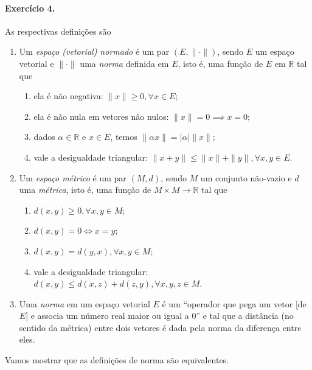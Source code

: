 \documentclass[12pt,a4paper]{article}
\begin{document}
\paragraph{Exercício 4.} As respectivas definições são
\begin{enumerate}
    \item Um \textit{espaço (vetorial) normado} é um par $(E, \|\cdot \|)$, sendo $E$ um espaço vetorial e $\|\cdot \|$ 
    uma \textit{norma} definida em $E$, isto é, uma função de $E$ em $\mathbb{R}$ tal que
    \begin{enumerate}
        \item ela é não negativa: $\|x\| \geq 0, \forall x\in E$;
        \item ela é não nula em vetores não nulos: $\|x\| = 0 \implies x = 0$;
        \item dados $\alpha\in\mathbb{R}$ e $x\in E$, temos $\|\alpha x\| = |\alpha| \|x\|$;
        \item vale a desigualdade triangular: $\|x+y\| \leq \|x\| + \|y\|, \forall x,y\in E$.
    \end{enumerate}
    
    \item Um \textit{espaço métrico} é um par $(M, d)$, sendo $M$ um conjunto não-vazio e $d$ uma \textit{métrica}, isto é,
    uma função de $M\times M \to \mathbb{R}$ tal que
    \begin{enumerate}
        \item $d(x,y) \geq 0, \forall x,y\in M$;
        \item $d(x,y) = 0 \iff x = y$;
        \item $d(x,y) = d(y,x), \forall x,y \in M$;
        \item vale a desigualdade triangular: $d(x,y) \leq d(x,z) + d(z,y), \forall x,y,z\in M$.
    \end{enumerate}
    
    \item Uma \textit{norma} em um espaço vetorial $E$ é um ``operador que pega um vetor [de $E$] e associa um número real maior 
    ou igual a 0'' e tal que a distância (no sentido da métrica) entre dois vetores é dada pela norma da diferença entre eles.
\end{enumerate}

Vamos mostrar que as definições de norma são equivalentes.
\end{document}
